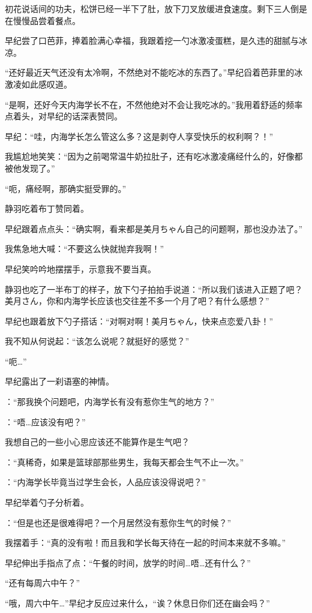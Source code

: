 初花说话间的功夫，松饼已经一半下了肚，放下刀叉放缓进食速度。剩下三人倒是在慢慢品尝着餐点。

早纪尝了口芭菲，捧着脸满心幸福，我跟着挖一勺冰激凌蛋糕，是久违的甜腻与冰凉。

“还好最近天气还没有太冷啊，不然绝对不能吃冰的东西了。”早纪舀着芭菲里的冰激凌如此感叹道。

“是啊，还好今天内海学长不在，不然他绝对不会让我吃冰的。”我用着舒适的频率点着头，对早纪的话深表赞同。

早纪：“哇，内海学长怎么管这么多？这是剥夺人享受快乐的权利啊？！”

我尴尬地笑笑：“因为之前喝常温牛奶拉肚子，还有吃冰激凌痛经什么的，好像都被他发现了。”

“呃，痛经啊，那确实挺受罪的。”

静羽吃着布丁赞同着。

早纪跟着点点头：“确实啊，看来都是美月ちゃん自己的问题啊，那也没办法了。”

我焦急地大喊：“不要这么快就抛弃我啊！”

早纪笑吟吟地摆摆手，示意我不要当真。

静羽也吃了一半布丁的样子，放下勺子拍拍手说道：“所以我们该进入正题了吧？美月さん，你和内海学长应该也交往差不多一个月了吧？有什么感想？”

早纪也跟着放下勺子搭话：“对啊对啊！美月ちゃん，快来点恋爱八卦！”

我不知从何说起：“该怎么说呢？就挺好的感觉？”

“呃…”

早纪露出了一刹语塞的神情。

\shizuha：“那我换个问题吧，内海学长有没有惹你生气的地方？”

\jelly：“唔…应该没有吧？”

我想自己的一些小心思应该还不能算作是生气吧？

\ichika：“真稀奇，如果是篮球部那些男生，我每天都会生气不止一次。”

\saki：“内海学长毕竟当过学生会长，人品应该没得说吧？”

早纪举着勺子分析着。

\shizuha：“但是也还是很难得吧？一个月居然没有惹你生气的时候？”

我摆着手：“真的没有啦！而且我和学长每天待在一起的时间本来就不多嘛。”

早纪伸出手指点了点：“午餐的时间，放学的时间…唔…还有什么？”

“还有每周六中午？”

“哦，周六中午…”早纪才反应过来什么，“诶？休息日你们还在幽会吗？”

